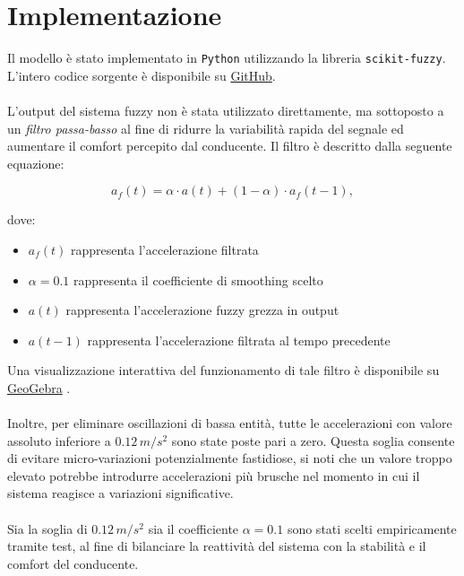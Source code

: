 \chapter{Implementazione}

Il modello è stato implementato in \texttt{Python} utilizzando la libreria \texttt{scikit-fuzzy}.  
L'intero codice sorgente è disponibile su \href{https://github.com/Leso246/FuzzyACC}{GitHub}.
\\\\
\noindent L'output del sistema fuzzy non è stata utilizzato direttamente, ma sottoposto a un \emph{filtro passa-basso} 
al fine di ridurre la variabilità rapida del segnale ed aumentare il comfort percepito dal conducente.  
Il filtro è descritto dalla seguente equazione:

\[
a_{f}(t) = \alpha \cdot a(t) + (1 - \alpha) \cdot a_{f}(t-1),
\]

\noindent dove:
\begin{itemize}
    \item $a_{f}(t)$ rappresenta l'accelerazione filtrata
    \item $\alpha = 0.1$ rappresenta il coefficiente di smoothing scelto
    \item $a(t)$ rappresenta l'accelerazione fuzzy grezza in output
    \item $a(t-1)$ rappresenta l'accelerazione filtrata al tempo precedente
\end{itemize}
Una visualizzazione interattiva del funzionamento di tale filtro è disponibile 
su \href{https://www.geogebra.org/m/tb88mqrm}{GeoGebra} \cite{geogebraEWMA}.
\\\\
\noindent Inoltre, per eliminare oscillazioni di bassa entità, tutte le accelerazioni con valore assoluto inferiore a $0.12 \, m/s^2$ 
sono state poste pari a zero.  
Questa soglia consente di evitare micro-variazioni potenzialmente fastidiose, si noti che un valore troppo elevato potrebbe
introdurre accelerazioni più brusche nel momento in cui il sistema reagisce a variazioni significative.
\\\\
\noindent Sia la soglia di $0.12 \, m/s^2$ sia il coefficiente $\alpha = 0.1$ sono stati scelti empiricamente tramite test, 
al fine di bilanciare la reattività del sistema con la stabilità e il comfort del conducente.


